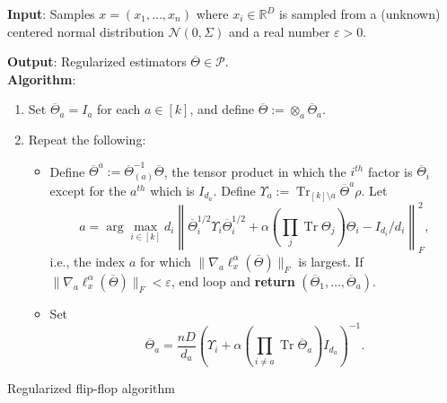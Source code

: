 \documentclass[aos]{imsart}
\theoremstyle{definition}
\numberwithin{equation}{section}
\DeclareMathOperator{\tr}{Tr}
\DeclarePairedDelimiter{\norm}{\lVert}{\rVert}
\newcommand{\R}{{\mathbb{R}}}
\newcommand{\otheta}{\overline{\Theta}}
\newcommand{\ot}{\otimes}
\newcommand{\eps}{\varepsilon}
\newcommand{\cN}{\mathcal{N}}
\newcommand{\SPD}{\mathcal{P}}
\newcommand{\samp}{x}
\begin{document}
\begin{Algorithm}
\textbf{Input}: Samples $\samp = (\samp_1, \ldots, \samp_n)$ where $\samp_i \in \R^D$ is sampled from a (unknown) centered normal distribution $\cN(0, \Sigma)$ and a real number $\eps > 0$.  

\textbf{Output}: Regularized estimators $\otheta \in \SPD$.\\[.1ex]

\textbf{Algorithm}:
\begin{enumerate}
\item\label{it:flip-flop step 1} Set $\otheta_a = I_a$ for each $a \in [k]$, and define $\otheta:= \otimes_a \otheta_a$.
\item\label{it:flip-flop step 2} Repeat the following:
\begin{itemize}
\item Define $\otheta^a:= \otheta_{(a)}^{-1} \otheta$, the tensor product in which the $i^{th}$ factor is $\otheta_i$ except for the $a^{th}$ which is $I_{d_a}$. Define $\Upsilon_a :=\tr_{[k] \setminus a} \otheta^a \rho$. Let $$a = \arg\max_{i \in [k]} d_i   \left\| \otheta_i^{1/2} \Upsilon_i \otheta_i^{1/2}  + \alpha (\prod_j \tr \Theta_j) \Theta_i - I_{d_i}/d_i\right\|_F^2,$$ 
i.e., the index $a$ for which $\|\nabla_a \ell^\alpha_{\samp}(\otheta)\|_F$ is largest. If $\|\nabla_a \ell^\alpha_\samp(\otheta)\|_F < \eps$, end loop and \textbf{return} $(\otheta_1, \dots, \otheta_a)$.  
\item Set 
$$\otheta_a = \frac{n D}{d_a}\left(\Upsilon_i + \alpha \left(\prod_{i \neq a} \tr \otheta_a\right) I_{d_a} \right)^{-1}.$$
\end{itemize}
\end{enumerate}
\caption{Regularized flip-flop algorithm}\label{alg:reg-flip-flop}
\end{Algorithm}
\end{document}
